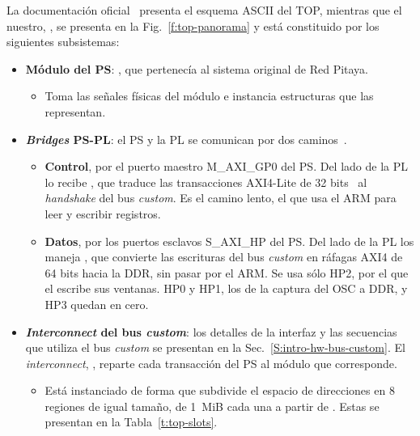 La documentación oficial~\cite{RedPitayaDocs} presenta el esquema ASCII del
TOP, mientras que el nuestro, , se presenta en la
Fig.~\ref{f:top-panorama} y está constituido por los siguientes subsistemas:
\begin{itemize}
  \item \textbf{Módulo del PS}: , que pertenecía al
    sistema original de Red Pitaya.
  \begin{itemize}
    \item Toma las señales físicas del módulo e instancia estructuras que las
      representan.
  \end{itemize}
  \item \textbf{\emph{Bridges} PS-PL}: el PS y la PL se comunican por dos
    caminos~\cite{UG585}.
  \begin{itemize}
    \item \textbf{Control}, por el puerto maestro M\_AXI\_GP0 del PS. Del lado de
      la PL lo recibe , que traduce las transacciones
      AXI4-Lite de 32 bits~\cite{AMBAAXI} al \emph{handshake} del bus \emph{custom}. Es el
      camino lento, el que usa el ARM para leer y escribir registros.
    \item \textbf{Datos}, por los puertos esclavos S\_AXI\_HP del PS. Del lado
      de la PL los maneja , que convierte las escrituras del
      bus \emph{custom} en ráfagas AXI4 de 64 bits hacia la DDR, sin pasar por el ARM.
      Se usa sólo HP2, por el que el  escribe sus ventanas.
      HP0 y HP1, los de la captura del OSC a DDR, y HP3 quedan en cero.
  \end{itemize}
  \item \textbf{\emph{Interconnect} del bus \emph{custom}}: los detalles de la interfaz y las
    secuencias que utiliza el bus \emph{custom} se presentan en la
    Sec.~\ref{S:intro-hw-bus-custom}. El \emph{interconnect},
    , reparte cada transacción del PS al módulo
    que corresponde.
  \begin{itemize}
    \item Está instanciado de forma que subdivide el espacio de direcciones en 8
      regiones de igual tamaño, de 1~MiB cada una a partir de
      . Estas se presentan en la
      Tabla~\ref{t:top-slots}.
  \end{itemize}
\end{itemize}

